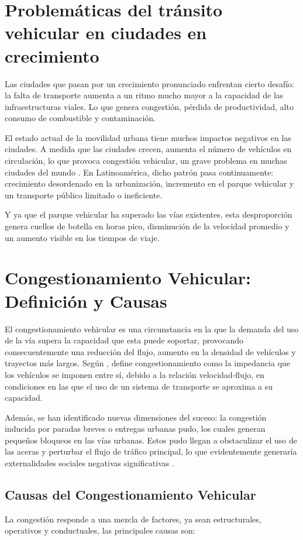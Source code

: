 \section{Problemáticas del tránsito vehicular en ciudades en crecimiento}
Las ciudades que pasan por un crecimiento pronunciado enfrentan cierto desafío: la falta de 
transporte aumenta a un ritmo mucho mayor a la capacidad de las infraestructuras viales. Lo que 
genera congestión, pérdida de productividad, alto consumo de combustible y contaminación.

El estado actual de la movilidad urbana tiene muchos impactos negativos en las ciudades. 
A medida que las ciudades crecen, aumenta el número de vehículos en circulación, lo que 
provoca congestión vehicular, un grave problema en muchas ciudades del mundo \cite{aprigliano_sustainable_2023}.
En Latinoamérica, dicho patrón pasa continuamente: crecimiento desordenado en la urbanización, 
incremento en el parque vehicular y un transporte público limitado o ineficiente.

Y ya que el parque vehicular ha superado las vías existentes, esta desproporción genera cuellos 
de botella en horas pico, disminución de la velocidad promedio y un aumento visible en los tiempos 
de viaje.

\section{Congestionamiento Vehicular: Definición y Causas}
El congestionamiento vehicular es una circunstancia en la que la demanda del uso de la vía supera 
la capacidad que esta puede soportar, provocando consecuentemente una reducción del flujo, aumento 
en la densidad de vehículos y trayectos más largos. Según \cite{bedoya-maya_estimating_2022}, define 
congestionamiento como la impedancia que los vehículos se imponen entre sí, debido a la 
relación velocidad-flujo, en condiciones en las que el uso de un sistema de transporte se 
aproxima a su capacidad.

Además, se han identificado nuevas dimensiones del suceso: la congestión inducida por paradas 
breves o entregas urbanas \acrfull{pudo}, los cuales generan pequeños bloqueos en 
las vías urbanas. Estos \acrshort{pudo} llegan a obstaculizar el uso de las aceras y perturbar el flujo de 
tráfico principal, lo que evidentemente generaría externalidades sociales negativas 
significativas \cite{liu_estimating_2024}.

\subsection{Causas del Congestionamiento Vehicular}
La congestión responde a una mezcla de factores, ya sean estructurales, operativos y 
conductuales, las principales causas son:

